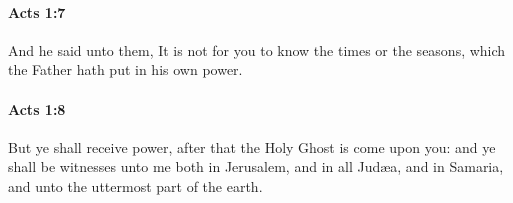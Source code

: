 		\paragraph{Acts 1:7} %
			\label{ACTS-1-7}

			And he said unto them, It is not for you to know the times or the seasons, which the Father hath put in his own power.

			\begin{framed}
			\scriptsize
				\begin{compactdesc}
					\item[SBLG] 
				\end{compactdesc}
			\end{framed}

		\paragraph{Acts 1:8} %
			\label{ACTS-1-8}

			But ye shall receive power, after that the Holy Ghost is come upon you: and ye shall be witnesses unto me both in Jerusalem, and in all Judæa, and in Samaria, and unto the uttermost part of the earth.

